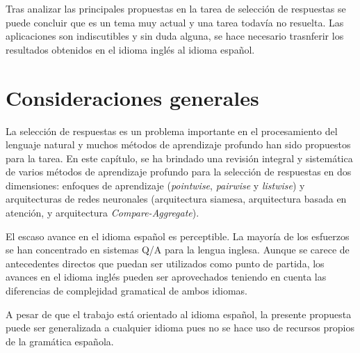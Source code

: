 Tras analizar las principales propuestas en la tarea de selección de respuestas se puede concluir que es un tema muy actual y una tarea todavía no resuelta. Las aplicaciones son indiscutibles y sin duda alguna, se hace necesario trasnferir los resultados obtenidos en el idioma inglés al idioma español.


\section{Consideraciones generales}

La selección de respuestas es un problema importante en el procesamiento del lenguaje natural y muchos métodos de aprendizaje profundo han sido propuestos para la tarea. En este capítulo, se ha brindado una revisión integral y sistemática de varios métodos de aprendizaje profundo para la selección de respuestas en dos dimensiones: enfoques de aprendizaje (\textit{pointwise}, \textit{pairwise} y \textit{listwise}) y arquitecturas de redes neuronales (arquitectura siamesa, arquitectura basada en atención, y arquitectura \textit{Compare-Aggregate}).

El escaso avance en el idioma español es perceptible. La mayoría de los esfuerzos se han concentrado en sistemas Q/A para la lengua inglesa. Aunque se carece de antecedentes directos que puedan ser utilizados como punto de partida, los avances en el idioma inglés pueden ser aprovechados teniendo en cuenta las diferencias de complejidad gramatical de ambos idiomas.

A pesar de que el trabajo está orientado al idioma español, la presente propuesta puede ser generalizada a cualquier idioma pues no se hace uso de recursos propios de la gramática española.
